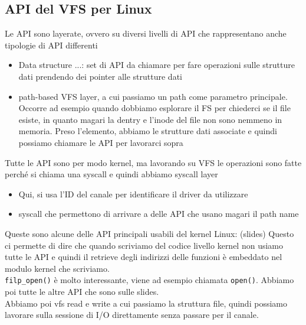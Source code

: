 \documentclass[12pt, oneside]{extbook}
\begin{document}
\subsection{API del VFS per Linux}
Le API sono layerate, ovvero su diversi livelli di API che rappresentano anche tipologie di API differenti
\begin{itemize}
\item Data structure ...: set di API da chiamare per fare operazioni sulle strutture dati prendendo dei pointer alle strutture dati
\item path-based VFS layer, a cui passiamo un path come parametro principale. Occorre ad esempio quando dobbiamo esplorare il FS per chiederci se il file esiste, in quanto magari la dentry e l'inode del file non sono nemmeno in memoria. Preso l'elemento, abbiamo le strutture dati associate e quindi possiamo chiamare le API per lavorarci sopra
\end{itemize}
Tutte le API sono per modo kernel, ma lavorando su VFS le operazioni sono fatte perché si chiama una syscall e quindi abbiamo syscall layer
\begin{itemize}
\item Qui, si usa l'ID del canale per identificare il driver da utilizzare
\item syscall che permettono di arrivare a delle API che usano magari il path name
\end{itemize}
Queste sono alcune delle API principali usabili del kernel Linux:
(slides)
Questo ci permette di dire che quando scriviamo del codice livello kernel non usiamo tutte le API e quindi il retrieve degli indirizzi delle funzioni è embeddato nel modulo kernel che scriviamo.\\ \texttt{filp\_open()} è molto interessante, viene ad esempio chiamata \texttt{open()}. Abbiamo poi tutte le altre API che sono sulle slides.\\Abbiamo poi vfs read e write a cui passiamo la struttura file, quindi possiamo lavorare sulla sessione di I/O direttamente senza passare per il canale.
\end{document}
